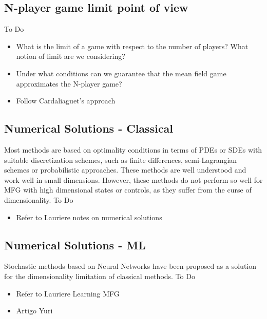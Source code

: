\documentclass{article}
\begin{document}
\subsection{N-player game limit point of view}
To Do
\begin{itemize}
    \item What is the limit of a game with respect to the number of players? What notion of limit are we considering?
    \item Under what conditions can we guarantee that the mean field game approximates the N-player game?
    \item Follow Cardaliaguet's approach
\end{itemize}





\subsection{Numerical Solutions - Classical}


Most methods are based on optimality conditions in terms of PDEs or SDEs with suitable discretization schemes, such as finite differences, semi-Lagrangian schemes or probabilistic approaches. These methods are well understood and work well in small dimensions. However, these methods do not perform so well for MFG with high dimensional states or controls, as they suffer from the curse of dimensionality.
To Do
\begin{itemize}
    \item Refer to Lauriere notes on numerical solutions
\end{itemize}

\subsection{Numerical Solutions - ML}
Stochastic methods based on Neural Networks have been proposed as a solution for the dimensionality limitation of classical methods.
To Do
\begin{itemize}
    \item Refer to Lauriere Learning MFG
    \item Artigo Yuri
\end{itemize}
\end{document}
